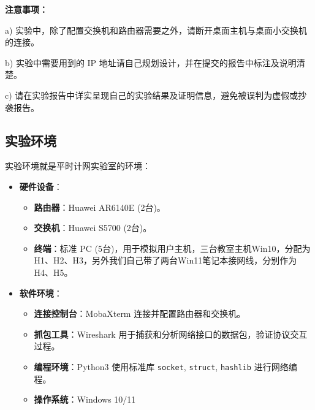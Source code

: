 \documentclass[a4paper]{article}
\begin{document}
\textbf{注意事项：}

a) 实验中，除了配置交换机和路由器需要之外，请断开桌面主机与桌面小交换机的连接。

b) 实验中需要用到的 IP 地址请自己规划设计，并在提交的报告中标注及说明清楚。

c) 请在实验报告中详实呈现自己的实验结果及证明信息，避免被误判为虚假或抄袭报告。

\subsection{实验环境}

实验环境就是平时计网实验室的环境：

\begin{itemize}
    \item \textbf{硬件设备}：
    \begin{itemize}
        \item \textbf{路由器}：Huawei AR6140E (2台)。
        \item \textbf{交换机}：Huawei S5700 (2台)。
        \item \textbf{终端}：标准 PC (5台)，用于模拟用户主机，三台教室主机Win10，分配为H1、H2、H3，另外我们自己带了两台Win11笔记本接网线，分别作为H4、H5。
    \end{itemize}
    \item \textbf{软件环境}：
    \begin{itemize}
        \item \textbf{连接控制台}：MobaXterm 连接并配置路由器和交换机。
        \item \textbf{抓包工具}：Wireshark 用于捕获和分析网络接口的数据包，验证协议交互过程。
        \item \textbf{编程环境}：Python3 使用标准库 \texttt{socket}, \texttt{struct}, \texttt{hashlib} 进行网络编程。
        \item \textbf{操作系统}：Windows 10/11
    \end{itemize}
\end{itemize}

\end{document}
